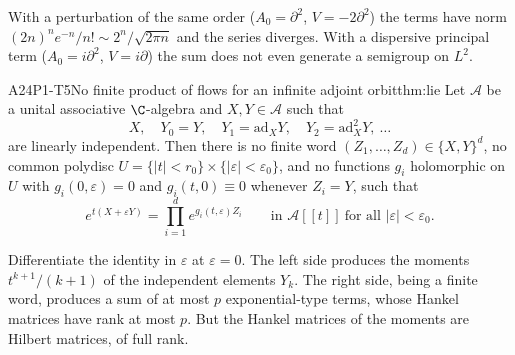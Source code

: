 \begin{caution}[title={The hypotheses cannot be dropped \led{P3-C1}}]
With a perturbation of the same order ($A_0=\partial^2$, $V=-2\partial^2$) the terms have norm $(2n)^ne^{-n}/n!\sim2^n/\sqrt{2\pi n}$ and the series diverges. With a dispersive principal term ($A_0=i\partial^2$, $V=i\partial$) the sum does not even generate a semigroup on $L^2$.
\end{caution}

\begin{dimcard}{A24}{P1-T5}{No finite product of flows for an infinite adjoint orbit}{\proved}{thm:lie}
Let $\mathcal A$ be a unital associative $\C$-algebra and $X,Y\in\mathcal A$ such that
\[
X,\quad Y_0=Y,\quad Y_1=\mathrm{ad}_XY,\quad Y_2=\mathrm{ad}_X^2Y,\ \dots
\]
are linearly independent. Then there is no finite word $(Z_1,\dots,Z_d)\in\{X,Y\}^d$, no common polydisc $U=\{|t|<r_0\}\times\{|\varepsilon|<\varepsilon_0\}$, and no functions $g_i$ holomorphic on $U$ with $g_i(0,\varepsilon)=0$ and $g_i(t,0)\equiv0$ whenever $Z_i=Y$, such that
\[
e^{t(X+\varepsilon Y)}=\prod_{i=1}^de^{g_i(t,\varepsilon)Z_i}\qquad\text{in }\mathcal A[[t]]\ \text{for all }|\varepsilon|<\varepsilon_0 .
\]
\end{dimcard}

\begin{proofidea}
Differentiate the identity in $\varepsilon$ at $\varepsilon=0$. The left side produces the moments $t^{k+1}/(k+1)$ of the independent elements $Y_k$. The right side, being a finite word, produces a sum of at most $p$ exponential-type terms, whose Hankel matrices have rank at most $p$. But the Hankel matrices of the moments are Hilbert matrices, of full rank.
\end{proofidea}

